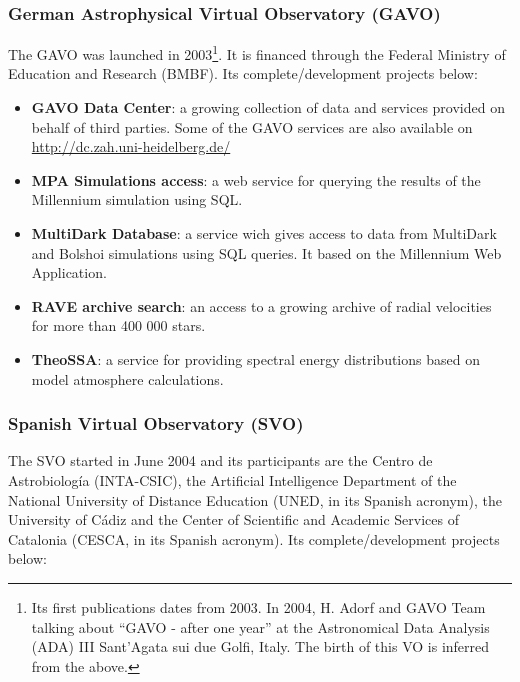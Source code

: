 \subsubsection{German Astrophysical Virtual Observatory (GAVO)}
The GAVO \cite{website:gavo-home} was launched in 2003\footnote{Its first
publications dates from 2003. In 2004, H. Adorf and GAVO Team talking about
``GAVO - after one year'' at the Astronomical Data Analysis (ADA) III Sant'Agata
sui due Golfi, Italy. The birth of this VO is inferred from the above.}. It is
financed through the Federal Ministry of Education and Research (BMBF). Its
complete/development projects below:

\begin{itemize}
\item \textbf{GAVO Data Center}:
a growing collection of data and services provided on behalf of third parties.
Some of the GAVO services are also available on
\url{http://dc.zah.uni-heidelberg.de/}

\item \textbf{MPA Simulations access}:
a web service for querying the results of the Millennium simulation using SQL.

\item \textbf{MultiDark Database}:
a service wich gives access to data from MultiDark and Bolshoi simulations using
SQL queries.  It based on the Millennium Web Application.

\item \textbf{RAVE archive search}:
an access to a growing archive of radial velocities for more than 400 000 stars.

\item \textbf{TheoSSA}:
a service for providing spectral energy distributions based on model atmosphere
calculations.
\end{itemize}


\subsubsection{Spanish Virtual Observatory (SVO)}
The SVO \cite{website:svo-home} started in June 2004 and its participants are
the Centro de Astrobiolog\'{i}a (INTA-CSIC), the Artificial Intelligence
Department of the National University of Distance Education (UNED, in its
Spanish acronym), the University of C\'{a}diz and the Center of Scientific and
Academic Services of Catalonia (CESCA, in its Spanish acronym). Its
complete/development projects below:

